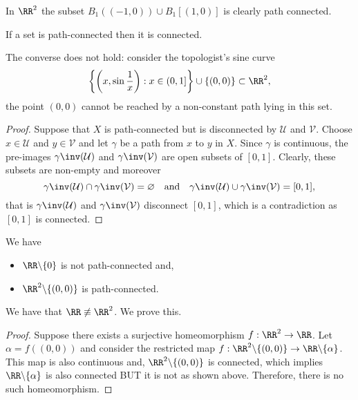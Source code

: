 \documentclass[12pt, a4paper]{article}
\begin{document}
\begin{example}
    In \(\RR^2\) the subset \(B_1((-1,0)) \cup B_1[(1,0)]\) is clearly path connected.
\end{example}

\begin{mdthm}
    If a set is path-connected then it is connected.
\end{mdthm}

\begin{mdremark}
    The converse does not hold: consider the topologist's sine curve
    \[\left\{ \left( x,\sin\frac{1}{x} \right) : x \in (0,1] \right\} \cup \{(0,0)\} \subset \RR^2,\]
    the point \((0,0)\) cannot be reached by a non-constant path lying in this set.
\end{mdremark}

\begin{proof}
    Suppose that \(X\) is path-connected but is disconnected by \(\mathcal{U}\) and \(\mathcal{V}\). Choose \(x \in \mathcal{U}\) and \(y \in \mathcal{V}\) and let \(\gamma\) be a path from \(x\) to \(y\) in \(X\). Since \(\gamma\) is continuous, the pre-images \(\gamma\inv(\mathcal{U})\) and \(\gamma\inv(\mathcal{V})\) are open subsets of \([0,1]\). Clearly, these subsets are non-empty and moreover 
    \[\gamma\inv(\mathcal{U}) \cap \gamma\inv(\mathcal{V}) =\varnothing \quad \text{and} \quad \gamma\inv(\mathcal{U}) \cup \gamma\inv(\mathcal{V})=[0,1],\]
    that is \(\gamma\inv(\mathcal{U})\) and \(\gamma\inv(\mathcal{V})\) disconnect \([0,1]\), which is a contradiction as \([0,1]\) is connected.
\end{proof}

\begin{mdexample}
    We have
    \begin{itemize}
        \item \(\RR \backslash \{0\}\) is not path-connected and,
        \item \(\RR^2 \backslash \{(0,0)\}\) is path-connected.
    \end{itemize}
    We have that \(\RR \not\equiv \RR^2\). We prove this.
    \begin{proof}
        Suppose there exists a surjective homeomorphism \(f : \RR^2 \to \RR\). Let \(\alpha = f((0,0))\) and consider the restricted map \(f: \RR^2 \backslash \{(0,0)\} \to \RR \backslash \{\alpha\}\). This map is also continuous and, \(\RR^2 \backslash \{(0,0)\}\) is connected, which implies \(\RR \backslash \{\alpha\}\) is also connected BUT it is not as shown above. Therefore, there is no such homeomorphism.
    \end{proof}
\end{mdexample}
\end{document}
